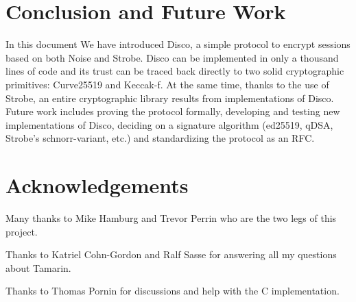 \documentclass{article}
\begin{document}
\section{Conclusion and Future Work}

In this document We have introduced Disco, a simple protocol to encrypt sessions based on both Noise and Strobe. Disco can be implemented in only a thousand lines of code and its trust can be traced back directly to two solid cryptographic primitives: Curve25519 and Keccak-f. At the same time, thanks to the use of Strobe, an entire cryptographic library results from implementations of Disco. Future work includes proving the protocol formally, developing and testing new implementations of Disco, deciding on a signature algorithm (ed25519, qDSA, Strobe's schnorr-variant, etc.) and standardizing the protocol as an RFC.

\section*{Acknowledgements}

Many thanks to Mike Hamburg and Trevor Perrin who are the two legs of this project.

Thanks to Katriel Cohn-Gordon and Ralf Sasse for answering all my questions about Tamarin.

Thanks to Thomas Pornin for discussions and help with the C implementation.

\newpage
\printbibliography
\end{document}
